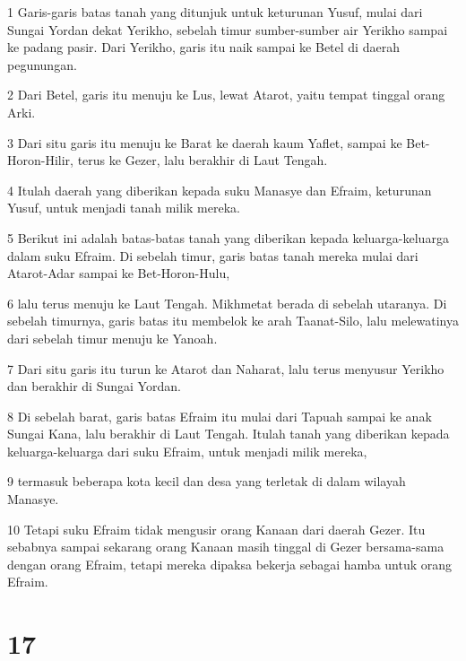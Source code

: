 \par 1 Garis-garis batas tanah yang ditunjuk untuk keturunan Yusuf, mulai dari Sungai Yordan dekat Yerikho, sebelah timur sumber-sumber air Yerikho sampai ke padang pasir. Dari Yerikho, garis itu naik sampai ke Betel di daerah pegunungan.
\par 2 Dari Betel, garis itu menuju ke Lus, lewat Atarot, yaitu tempat tinggal orang Arki.
\par 3 Dari situ garis itu menuju ke Barat ke daerah kaum Yaflet, sampai ke Bet-Horon-Hilir, terus ke Gezer, lalu berakhir di Laut Tengah.
\par 4 Itulah daerah yang diberikan kepada suku Manasye dan Efraim, keturunan Yusuf, untuk menjadi tanah milik mereka.
\par 5 Berikut ini adalah batas-batas tanah yang diberikan kepada keluarga-keluarga dalam suku Efraim. Di sebelah timur, garis batas tanah mereka mulai dari Atarot-Adar sampai ke Bet-Horon-Hulu,
\par 6 lalu terus menuju ke Laut Tengah. Mikhmetat berada di sebelah utaranya. Di sebelah timurnya, garis batas itu membelok ke arah Taanat-Silo, lalu melewatinya dari sebelah timur menuju ke Yanoah.
\par 7 Dari situ garis itu turun ke Atarot dan Naharat, lalu terus menyusur Yerikho dan berakhir di Sungai Yordan.
\par 8 Di sebelah barat, garis batas Efraim itu mulai dari Tapuah sampai ke anak Sungai Kana, lalu berakhir di Laut Tengah. Itulah tanah yang diberikan kepada keluarga-keluarga dari suku Efraim, untuk menjadi milik mereka,
\par 9 termasuk beberapa kota kecil dan desa yang terletak di dalam wilayah Manasye.
\par 10 Tetapi suku Efraim tidak mengusir orang Kanaan dari daerah Gezer. Itu sebabnya sampai sekarang orang Kanaan masih tinggal di Gezer bersama-sama dengan orang Efraim, tetapi mereka dipaksa bekerja sebagai hamba untuk orang Efraim.

\chapter{17}

